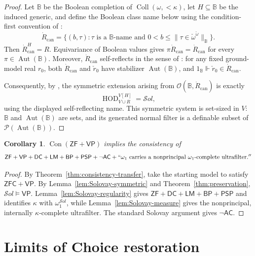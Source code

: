 \documentclass[11pt,a4paper]{amsart}
\newcommand{\VP}{\mathsf{VP}}
\newcommand{\AC}{\mathsf{AC}}
\newcommand{\ZF}{\mathsf{ZF}}
\newcommand{\ZFC}{\mathsf{ZFC}}
\newcommand{\Con}{\operatorname{Con}}
\newcommand{\HOD}{\operatorname{HOD}}
\newcommand{\Coll}{\operatorname{Coll}}
\newcommand{\Aut}{\operatorname{Aut}}
\newcommand{\DC}{\mathsf{DC}}
\newcommand{\LM}{\mathsf{LM}}
\newcommand{\BP}{\mathsf{BP}}
\newcommand{\PSP}{\mathsf{PSP}}
\theoremstyle{plain}
\newtheorem{corollary}[theorem]{Corollary}
\theoremstyle{definition}
\theoremstyle{remark}
\begin{document}
\begin{proof}
Let $\mathbb B$ be the Boolean completion of ${\Coll}(\omega,{<}\kappa)$, let $H\subseteq\mathbb B$ be the induced generic, and define the Boolean class name below using the condition-first convention of \cite{KaragilaSchilhan}:
\[
\dot R_{\mathrm{can}}=
\{(b,\tau):\tau\text{ is a }\mathbb B\text{-name and }
0<b\leq\|\tau\in\check\omega^{\check\omega}\|_{\mathbb B}\}.
\]
Then $\dot R_{\mathrm{can}}^H=R$.  Equivariance of Boolean values gives
$\pi\dot R_{\mathrm{can}}=\dot R_{\mathrm{can}}$ for every
$\pi\in\Aut(\mathbb B)$.  Moreover, $\dot R_{\mathrm{can}}$ self-reflects in the sense of \cite[Definitions~9.1--9.2]{KaragilaSchilhan}: for any fixed ground-model real $r_0$, both $\dot R_{\mathrm{can}}$ and $\check r_0$ have stabilizer $\Aut(\mathbb B)$, and
$1_{\mathbb B}\Vdash\check r_0\in\dot R_{\mathrm{can}}$.

Consequently, by \cite[Proposition~9.4]{KaragilaSchilhan}, the symmetric extension arising from
$\mathcal O(\mathbb B,\dot R_{\mathrm{can}})$ is exactly
\[
\HOD_{V\cup R}^{V[H]}=\mathcal S\!ol,
\]
using the displayed self-reflecting name.  This symmetric system is set-sized in $V$: $\mathbb B$ and $\Aut(\mathbb B)$ are sets, and its generated normal filter is a definable subset of
$\mathcal P(\Aut(\mathbb B))$.
\end{proof}

\begin{corollary}\label{cor:Solovay}
$\Con(\ZF+\VP)$ implies the consistency of
\[
\ZF+\VP+\DC+\LM+\BP+\PSP+\neg\AC+
``\omega_1\text{ carries a nonprincipal }\omega_1\text{-complete ultrafilter}.''
\]
\end{corollary}

\begin{proof}
By Theorem~\ref{thm:consistency-transfer}, take the starting model to satisfy $\ZFC+\VP$.  By Lemma~\ref{lem:Solovay-symmetric} and Theorem~\ref{thm:preservation},
$\mathcal S\!ol\models\VP$.  Lemma~\ref{lem:Solovay-regularity} gives $\ZF+\DC+\LM+\BP+\PSP$ and identifies $\kappa$ with $\omega_1^{\mathcal S\!ol}$, while Lemma~\ref{lem:Solovay-measure} gives the nonprincipal, internally $\kappa$-complete ultrafilter.  The standard Solovay argument gives $\neg\AC$.
\end{proof}

\begingroup

\section{{Limits of Choice restoration}}\label{sec:class-forcing}
\end{document}
